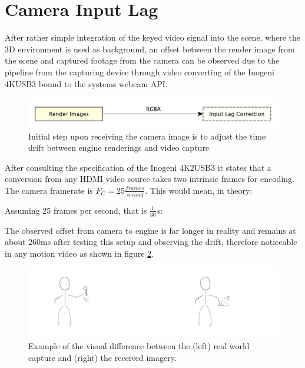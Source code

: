 %
\section{Camera Input Lag}

After rather simple integration of the keyed video signal into the scene, where 
the 3D environment is used as background, an offset between the render image 
from the scene and captured footage from the camera can be observed due to 
the pipeline from the capturing device through video converting of the Inogeni 
4KUSB3 bound to the systems webcam API.

\begin{figure}[htb]
	\includegraphics[width=\textwidth]{_raw_resources/pipeline_steps/4_2_swapper.pdf}
	\caption{Initial step upon receiving the camera image is to adjust the time 
	drift between engine renderings and video capture}
	\label{fig:steps:swapper}
\end{figure}

After consulting the specification of the Inogeni 4K2USB3 it states that a 
conversion from any HDMI video source takes two intrinsic frames for encoding. 
The camera framerate is $F_C = 25 \frac{frames}{second}$. This would mean, in 
theory:


Assuming 25 frames per second, that is $\frac{1}{30}s$:



The observed offset from camera to engine is far longer in reality and remains 
at about 260ms after testing this setup and observing the drift, therefore 
noticeable in any motion video as shown in figure \ref{fig:offsets:example}.

\begin{figure}[htb]
	\includegraphics[width=\textwidth]{_raw_resources/offsets/motion-difference.png}
	\caption{Example of the visual difference between the (left) real world 
	capture and (right) the received imagery.}
	\label{fig:offsets:example}
\end{figure}


